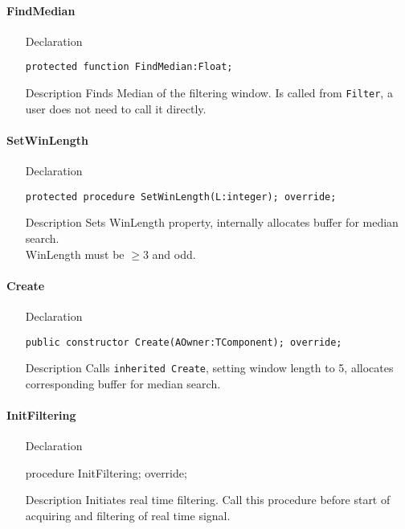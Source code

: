 \documentclass[12pt,a4paper,oneside]{report}
\newcommand{\declarationitem}[1]{{\addfontfeatures{FakeSlant} #1}}
\newcommand{\descriptiontitle}[1]{{\addfontfeatures{FakeSlant}#1}}
\newcommand{\code}[1]{\texttt{#1}}
\begin{document}
\paragraph{FindMedian}
\label{lmfilters.TMedianFilter-FindMedian}
\begin{itemize}\item[\declarationitem{Declaration}\hfill]
	\begin{flushleft}
		\code{protected function FindMedian:Float;}
	\end{flushleft}
\item[\descriptiontitle{Description}] Finds Median of the filtering window. Is called from \code{Filter}, a user does not need to call it directly.
\end{itemize}
\paragraph{SetWinLength}
\label{lmfilters.TMedianFilter-SetWinLength}
\begin{itemize}\item[\declarationitem{Declaration}\hfill]
	\begin{flushleft}
		\code{protected procedure SetWinLength(L:integer); override;}
	\end{flushleft}
\item[\descriptiontitle{Description}] Sets WinLength property, internally allocates buffer for median search.\\ WinLength must be $\ge 3$ and odd. 
\end{itemize}
\paragraph{Create}
\label{lmfilters.TMedianFilter-Create}
\begin{itemize}\item[\declarationitem{Declaration}\hfill]
	\begin{flushleft}
		\code{public constructor Create(AOwner:TComponent); override;}
	\end{flushleft}
\item[\descriptiontitle{Description}] Calls \code{inherited Create}, setting window length to 5, allocates corresponding buffer for median search.
\end{itemize}
\label{FindMedian.InitFiltering}
\paragraph{InitFiltering}
\begin{itemize}
	\item[\declarationitem{Declaration}\hfill]
	\begin{flushleft}
	procedure InitFiltering; override;	
	\end{flushleft}
	\item[\descriptiontitle{Description}]
	Initiates real time filtering. Call this procedure before start of acquiring and filtering of real time signal.
\end{itemize}	
\end{document}
